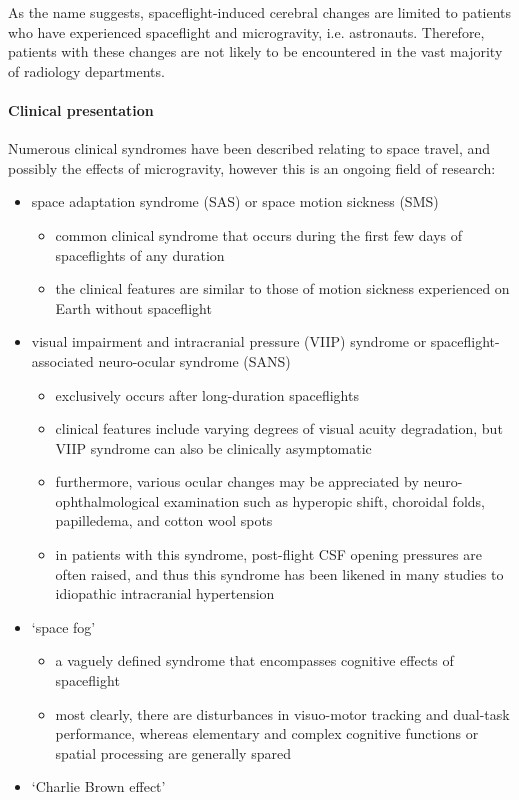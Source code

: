 As the name suggests, spaceflight-induced cerebral changes are limited to patients who have experienced spaceflight and microgravity, i.e. astronauts. Therefore, patients with these changes are not likely to be encountered in the vast majority of radiology departments.

\paragraph{Clinical presentation}

Numerous clinical syndromes have been described relating to space travel, and possibly the effects of microgravity, however this is an ongoing field of research:

\begin{itemize}
	\tightlist
	\item
	space adaptation syndrome (SAS) or space motion sickness (SMS)
	
	\begin{itemize}
		\tightlist
		\item
		common clinical syndrome that occurs during the first few days of spaceflights of any duration 
		\item
		the clinical features are similar to those of motion sickness experienced on Earth without spaceflight 
	\end{itemize}
	\item
	visual impairment and intracranial pressure (VIIP) syndrome or spaceflight-associated neuro-ocular syndrome (SANS)
	
	\begin{itemize}
		\tightlist
		\item
		exclusively occurs after long-duration spaceflights 
		\item
		clinical features include varying degrees of visual acuity degradation, but VIIP syndrome can also be clinically asymptomatic 
		\item
		furthermore, various ocular changes may be appreciated by neuro-ophthalmological examination such as hyperopic shift, choroidal folds, papilledema, and cotton wool spots 
		\item
		in patients with this syndrome, post-flight CSF opening pressures are often raised, and thus this syndrome has been likened in many studies to idiopathic intracranial hypertension
	\end{itemize}
	\item
	`space fog'
	
	\begin{itemize}
		\tightlist
		\item
		a vaguely defined syndrome that encompasses cognitive effects of spaceflight 
		\item
		most clearly, there are disturbances in visuo-motor tracking and dual-task performance, whereas elementary and complex cognitive functions or spatial processing are generally spared 
	\end{itemize}
	\item
	`Charlie Brown effect'
	

\end{itemize}
